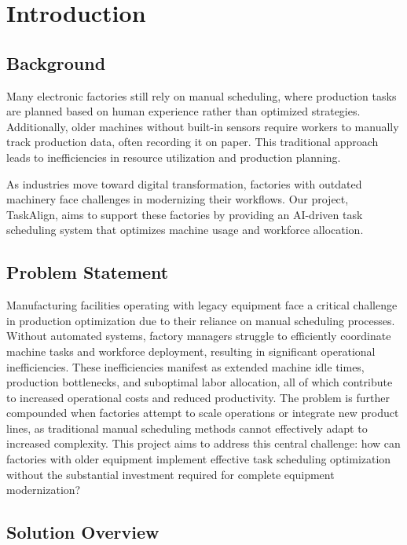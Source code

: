 \chapter{Introduction}
\label{chap:introduction}

\section{Background}
\label{section:background}

Many electronic factories still rely on manual scheduling, where production tasks are planned based on human experience rather than optimized strategies. Additionally, older machines without built-in sensors require workers to manually track production data, often recording it on paper. This traditional approach leads to inefficiencies in resource utilization and production planning.

As industries move toward digital transformation, factories with outdated machinery face challenges in modernizing their workflows. Our project, TaskAlign, aims to support these factories by providing an AI-driven task scheduling system that optimizes machine usage and workforce allocation.
\section{Problem Statement}
\label{section:problem-statement}

Manufacturing facilities operating with legacy equipment face a critical challenge in production optimization due to their reliance on manual scheduling processes. Without automated systems, factory managers struggle to efficiently coordinate machine tasks and workforce deployment, resulting in significant operational inefficiencies. These inefficiencies manifest as extended machine idle times, production bottlenecks, and suboptimal labor allocation, all of which contribute to increased operational costs and reduced productivity. The problem is further compounded when factories attempt to scale operations or integrate new product lines, as traditional manual scheduling methods cannot effectively adapt to increased complexity. This project aims to address this central challenge: how can factories with older equipment implement effective task scheduling optimization without the substantial investment required for complete equipment modernization?

\section{Solution Overview}
\label{section:solution-overview}

